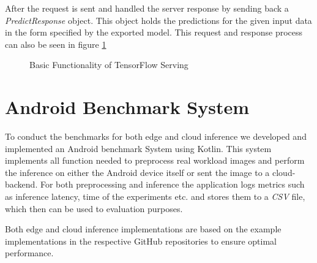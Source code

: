 After the request is sent and handled the server response by sending back a \emph{PredictResponse} object. This object holds the predictions for the given input data in the form specified by the exported model.
This request and response process can also be seen in figure \ref{fig:cloud}

\begin{figure}[H]
\centering

\caption{Basic Functionality of TensorFlow Serving}
\label{fig:cloud}
\end{figure}
 






\section{Android Benchmark System}
\label{chap:androidApp}
To conduct the benchmarks for both edge and cloud inference we developed and implemented an Android benchmark System using Kotlin.
This system implements all function needed to preprocess real workload images and perform the inference on either the Android device itself or sent the image to a cloud-backend.
For both preprocessing and inference the application logs metrics such as inference latency, time of the experiments etc. and stores them to a \emph{CSV} file, which then can be used to evaluation purposes.

Both edge and cloud inference implementations are based on the example implementations in the respective GitHub repositories to ensure optimal performance. 


